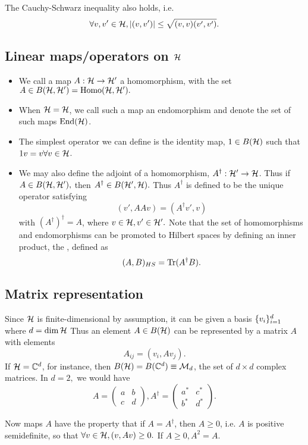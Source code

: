 The Cauchy-Schwarz inequality also holds, i.e.
\begin{equation}
    \forall v, v' \in \mathcal H, |(v,v')|\leq \sqrt{(v,v) (v',v')}.
\end{equation}

\subsection*{Linear maps/operators on $\mathcal H$}
\begin{itemize}
    \item We call a map $A:\mathcal H \to \mathcal H'$ a homomorphism, with the set $A\in B(\mathcal H, \mathcal H')=\text{Homo}(\mathcal H, \mathcal H').$
    \item When $\mathcal H = \mathcal H$, we call such a map an endomorphism and denote the set of such maps $\text{End}(\mathcal H)$.
    \item The simplest operator we can define is the identity map, $1\in B(\mathcal H)$ such that $1v = v \forall v\in \mathcal H$.
    \item We may also define the adjoint of a homomorphism, $A^\dagger: \mathcal H' \to \mathcal H$. Thus if $A\in B(\mathcal H, \mathcal H'),$ then $A^\dagger \in B(\mathcal H',\mathcal H).$ Thus $A^\dagger$ is defined to be the unique operator satisfying
    \begin{equation}
        (v',AAv) = (A^\dagger v',v)
    \end{equation}
    with $(A^\dagger)^\dagger = A$, where $v\in \mathcal H, v' \in \mathcal H'.$ Note that the set of homomorphisms and endomorphisms can be promoted to Hilbert spaces by defining an inner product, the , defined as
    \begin{equation}
        (A,B)_{HS}=\operatorname{Tr}(A^\dagger B).
    \end{equation}
\end{itemize}

\subsection*{Matrix representation} Since $\mathcal H$ is finite-dimensional by assumption, it can be given a basis $\{v_i\}^d_{i=1}$ where $d=\dim \mathcal H$ Thus an element $A\in B(\mathcal H)$ can be represented by a matrix $A$ with elements
\begin{equation}
    A_{ij}=(v_i,A v_j).
\end{equation}
If $\mathcal H=\mathbb{C}^d$, for instance, then $B(\mathcal H)=B(\mathbb{C}^d) \equiv \mathcal{M}_d$, the set of $d\times d$ complex matrices. In $d=2,$ we would have
\begin{equation}
    A=\begin{pmatrix}
        a & b\\
        c & d
    \end{pmatrix}, A^\dagger = \begin{pmatrix}
        a^* & c^* \\
        b^* & d^*
    \end{pmatrix}.
\end{equation}

Now maps $A$ have the property that if $A=A^\dagger$, then $A\geq 0$, i.e. $A$ is positive semidefinite, so that $\forall v\in \mathcal H, (v,Av)\geq 0.$ If $A\geq 0, A^2=A$.